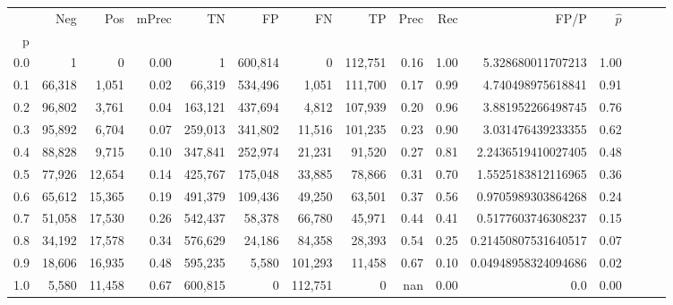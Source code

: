 \begin{tabular}{rrrrrrrrrrrrrrr}
\toprule
{} &     Neg &     Pos & mPrec &       TN &       FP &       FN &       TP &  Prec &   Rec &                 FP/P & $\hat{p}$ \\
p   &         &         &       &          &          &          &          &       &       &                      &           \\
\midrule
0.0 &       1 &       0 &  0.00 &        1 &  600,814 &        0 &  112,751 &  0.16 &  1.00 &    5.328680011707213 &      1.00 \\
0.1 &  66,318 &   1,051 &  0.02 &   66,319 &  534,496 &    1,051 &  111,700 &  0.17 &  0.99 &    4.740498975618841 &      0.91 \\
0.2 &  96,802 &   3,761 &  0.04 &  163,121 &  437,694 &    4,812 &  107,939 &  0.20 &  0.96 &    3.881952266498745 &      0.76 \\
0.3 &  95,892 &   6,704 &  0.07 &  259,013 &  341,802 &   11,516 &  101,235 &  0.23 &  0.90 &    3.031476439233355 &      0.62 \\
0.4 &  88,828 &   9,715 &  0.10 &  347,841 &  252,974 &   21,231 &   91,520 &  0.27 &  0.81 &   2.2436519410027405 &      0.48 \\
0.5 &  77,926 &  12,654 &  0.14 &  425,767 &  175,048 &   33,885 &   78,866 &  0.31 &  0.70 &   1.5525183812116965 &      0.36 \\
0.6 &  65,612 &  15,365 &  0.19 &  491,379 &  109,436 &   49,250 &   63,501 &  0.37 &  0.56 &   0.9705989303864268 &      0.24 \\
0.7 &  51,058 &  17,530 &  0.26 &  542,437 &   58,378 &   66,780 &   45,971 &  0.44 &  0.41 &   0.5177603746308237 &      0.15 \\
0.8 &  34,192 &  17,578 &  0.34 &  576,629 &   24,186 &   84,358 &   28,393 &  0.54 &  0.25 &  0.21450807531640517 &      0.07 \\
0.9 &  18,606 &  16,935 &  0.48 &  595,235 &    5,580 &  101,293 &   11,458 &  0.67 &  0.10 &  0.04948958324094686 &      0.02 \\
1.0 &   5,580 &  11,458 &  0.67 &  600,815 &        0 &  112,751 &        0 &   nan &  0.00 &                  0.0 &      0.00 \\
\bottomrule
\end{tabular}
